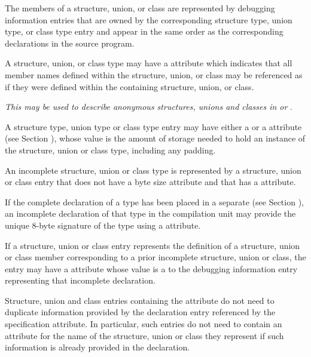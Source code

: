 {The members of a structure, union, or class are represented
by debugging information entries that are owned by the
corresponding structure type, union type, or class type entry
and appear in the same order as the corresponding declarations
in the source program.

A structure, union, or class type may have a \DWATexportsymbolsDEFN{}
attribute 
which indicates that all member names defined within 
the structure, union, or class may be referenced as if they were
defined within the containing structure, union, or class. 

\textit{This may be used to describe anonymous structures, unions 
and classes in  or }.

A\hypertarget{chap:DWATbitsizedatamemberbitsize}{} 
structure type, union type or class type entry may have
either a \DWATbytesize{} or a \DWATbitsize{} attribute 
(see Section ), 
whose value is the amount of storage needed
to hold an instance of the structure, union or class type,
including any padding.
  
An incomplete structure, union or class type 
is represented by a structure, union or class
entry that does not have a byte size attribute and that has
a \DWATdeclaration{} attribute.

If the complete declaration of a type has been placed 
in\hypertarget{chap:DWATsignaturetypesignature}{}
a separate 
(see Section ), 
an incomplete declaration 
of that type in the compilation unit may provide
the unique 8-byte signature of the type using a
\DWATsignatureDEFN{} attribute.

If a structure, union or class entry represents the definition
of a structure, union or class member corresponding to a prior
incomplete structure, union or class, the entry may have a
\DWATspecification{} attribute 
whose value is a  to
the debugging information entry representing that incomplete
declaration.

Structure, union and class entries containing the
\DWATspecification{} attribute 
do not need to duplicate
information provided by the declaration entry referenced by the
specification attribute.  In particular, such entries do not
need to contain an attribute for the name of the structure,
union or class they represent if such information is already
provided in the declaration.

}
